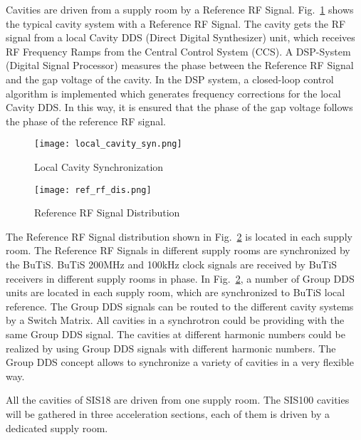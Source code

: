 Cavities are driven from a supply room by a Reference RF Signal. Fig.~\ref{local_cavity_syn} shows the typical cavity system with a Reference RF Signal. The cavity gets the RF signal from a local Cavity DDS (Direct Digital Synthesizer) unit, which receives RF Frequency Ramps from the Central Control System (CCS). A DSP-System (Digital Signal Processor) measures the phase between the Reference RF Signal and the gap voltage of the cavity. In the DSP system, a closed-loop control algorithm is implemented which generates frequency corrections for the local Cavity DDS. In this way, it is ensured that the phase of the gap voltage follows the phase of the reference RF signal. 
\begin{figure}[!htb]
   \centering   
   \texttt{[image: local\_cavity\_syn.png]}
   \caption{Local Cavity Synchronization}
   \label{local_cavity_syn}
\end{figure}
\begin{figure}[!htb]
   \centering   
   \texttt{[image: ref\_rf\_dis.png]}
   \caption{Reference RF Signal Distribution}
   \label{ref_rf_dis}
\end{figure}
The Reference RF Signal distribution shown in Fig.~\ref{ref_rf_dis} is located in each supply room. The Reference RF Signals in different supply rooms are synchronized by the BuTiS. BuTiS 200MHz and 100kHz clock signals are received by BuTiS receivers in different supply rooms in phase. In Fig.~\ref{ref_rf_dis}, a number of Group DDS units are located in each supply room, which are synchronized to BuTiS local reference. The Group DDS signals can be routed to the different cavity systems by a Switch Matrix. All cavities in a synchrotron could be providing with the same Group DDS signal. The cavities at different harmonic numbers could be realized by using Group DDS signals with different harmonic numbers. The Group DDS concept allows to synchronize a variety of cavities in a very flexible way. 

All the cavities of SIS18 are driven from one supply room. The SIS100 cavities will be gathered in three acceleration sections, each of them is
driven by a dedicated supply room. 



